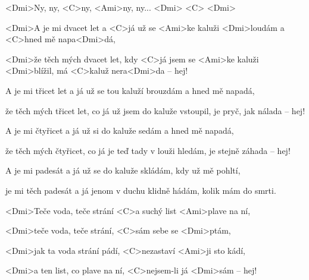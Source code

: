 

\zr
<Dmi>Ny, ny, <C>ny, <Ami>ny, ny... <Dmi> <C> <Dmi>
\kr

\zs
<Dmi>A je mi dvacet let a <C>já už se
<Ami>ke kaluži <Dmi>loudám a <C>hned mě napa<Dmi>dá,

<Dmi>že těch mých dvacet let,
kdy <C>já jsem se <Ami>ke kaluži <Dmi>blížil,
má <C>kaluž nera<Dmi>da -- hej!
\ks

\zr \kr

\zs
A je mi třicet let a já už se
tou kaluží brouzdám a hned mě napadá,

že těch mých třicet let,
co já už jsem do kaluže vstoupil,
je pryč, jak nálada -- hej!
\ks

\zr \kr

\zs
A je mi čtyřicet a já už si
do kaluže sedám a hned mě napadá,

že těch mých čtyřicet,
co já je teď tady v louži hledám,
je stejně záhada -- hej!
\ks

\zr \kr

\zs
A je mi padesát a já už se
do kaluže skládám, kdy už mě pohltí,

je mi těch padesát
a já jenom v duchu klidně hádám,
kolik mám do smrti.
\ks

\zs
<Dmi>Teče voda, teče strání
<C>a suchý list <Ami>plave na ní,

<Dmi>teče voda, teče strání,
<C>sám sebe se <Dmi>ptám,

<Dmi>jak ta voda strání pádí,
<C>nezastaví <Ami>ji sto kádí,

<Dmi>a ten list, co plave na ní,
<C>nejsem-li já <Dmi>sám -- hej!
\ks

\zr \kr

\kp
